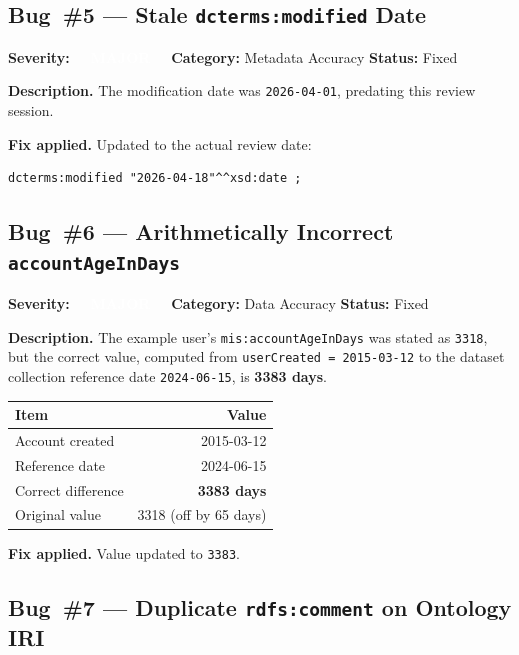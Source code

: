 \documentclass[11pt, a4paper]{article}
\newcommand{\badgeMajor}{\textcolor{white}{\colorbox{severity-major}{\footnotesize\textbf{\ \ MAJOR\ \ }}}}
\newcommand{\prop}[1]{\texttt{mis:#1}}
\begin{document}
\subsection{Bug~\#5 --- Stale \texttt{dcterms:modified} Date}
\label{bug:5}

\textbf{Severity:} \badgeMajor\quad
\textbf{Category:} Metadata Accuracy\quad
\textbf{Status:} Fixed

\textbf{Description.}
The modification date was \texttt{2026-04-01}, predating this review session.

\textbf{Fix applied.} Updated to the actual review date:
\begin{lstlisting}
dcterms:modified "2026-04-18"^^xsd:date ;
\end{lstlisting}

\subsection{Bug~\#6 --- Arithmetically Incorrect \texttt{accountAgeInDays}}
\label{bug:6}

\textbf{Severity:} \badgeMajor\quad
\textbf{Category:} Data Accuracy\quad
\textbf{Status:} Fixed

\textbf{Description.}
The example user's \prop{accountAgeInDays} was stated as \texttt{3318}, but
the correct value, computed from \texttt{userCreated = 2015-03-12} to the
dataset collection reference date \texttt{2024-06-15}, is \textbf{3383 days}.

\begin{center}
\begin{tabular}{@{} l r @{}}
\rowcolor{cair-light}
\textbf{Item} & \textbf{Value} \\
\midrule
Account created     & 2015-03-12 \\
\rowcolor{row-alt}
Reference date      & 2024-06-15 \\
Correct difference  & \textbf{3383 days} \\
\rowcolor{row-alt}
Original value      & 3318 (off by 65 days) \\
\end{tabular}
\end{center}

\textbf{Fix applied.} Value updated to \texttt{3383}.

\subsection{Bug~\#7 --- Duplicate \texttt{rdfs:comment} on Ontology IRI}
\label{bug:7}
\end{document}
